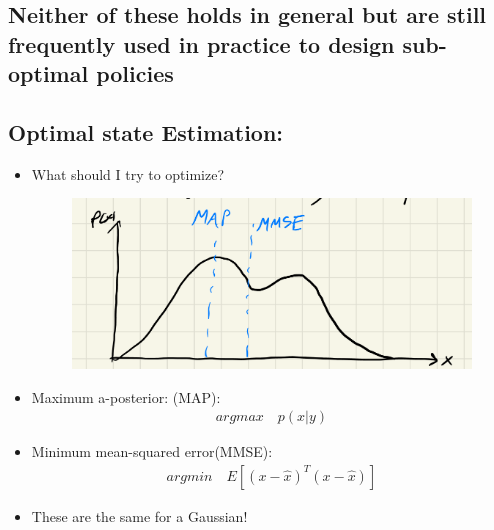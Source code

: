 \documentclass[11pt]{article}
\begin{document}
 \subsection*{Neither of these holds in general but are still frequently used in practice to design sub-optimal policies}

 \subsection*{Optimal state Estimation:}

 \begin{itemize}
     \item What should I try to optimize?
     \begin{figure}[H]
         \centering
         \includegraphics[width=0.5\linewidth]{lecture_19_1.png}
     \end{figure}
     \item Maximum a-posterior: (MAP):
     \begin{align*}
         argmax\quad p(x|y)
     \end{align*}
     \item Minimum mean-squared error(MMSE):
     \begin{align*}
         argmin\quad E[{(x-\hat{x})^T(x-\hat{x})}]
     \end{align*}
     \item These are the same for a Gaussian!
 \end{itemize}
\end{document}
